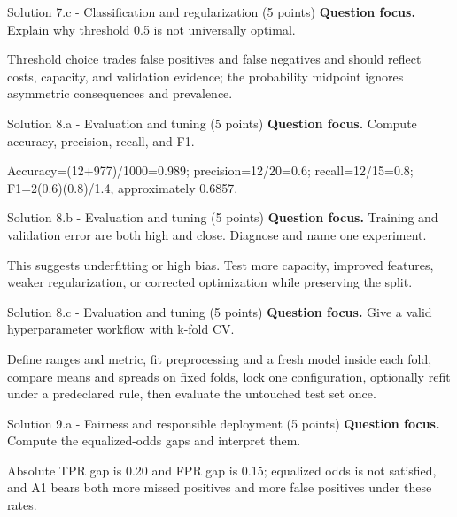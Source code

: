 \documentclass[aspectratio=169,11pt]{beamer}
\begin{document}
\begin{frame}{Solution 7.c - Classification and regularization (5 points)}
\small
\textbf{Question focus.} Explain why threshold 0.5 is not universally optimal.

\vspace{0.25cm}
\answerlabel Threshold choice trades false positives and false negatives and should reflect costs, capacity, and validation evidence; the probability midpoint ignores asymmetric consequences and prevalence.
\end{frame}

\begin{frame}{Solution 8.a - Evaluation and tuning (5 points)}
\small
\textbf{Question focus.} Compute accuracy, precision, recall, and F1.

\vspace{0.25cm}
\answerlabel Accuracy=(12+977)/1000=0.989; precision=12/20=0.6; recall=12/15=0.8; F1=2(0.6)(0.8)/1.4, approximately 0.6857.
\end{frame}

\begin{frame}{Solution 8.b - Evaluation and tuning (5 points)}
\small
\textbf{Question focus.} Training and validation error are both high and close. Diagnose and name one experiment.

\vspace{0.25cm}
\answerlabel This suggests underfitting or high bias. Test more capacity, improved features, weaker regularization, or corrected optimization while preserving the split.
\end{frame}

\begin{frame}{Solution 8.c - Evaluation and tuning (5 points)}
\small
\textbf{Question focus.} Give a valid hyperparameter workflow with k-fold CV.

\vspace{0.25cm}
\answerlabel Define ranges and metric, fit preprocessing and a fresh model inside each fold, compare means and spreads on fixed folds, lock one configuration, optionally refit under a predeclared rule, then evaluate the untouched test set once.
\end{frame}

\begin{frame}{Solution 9.a - Fairness and responsible deployment (5 points)}
\small
\textbf{Question focus.} Compute the equalized-odds gaps and interpret them.

\vspace{0.25cm}
\answerlabel Absolute TPR gap is 0.20 and FPR gap is 0.15; equalized odds is not satisfied, and A1 bears both more missed positives and more false positives under these rates.
\end{frame}
\end{document}
